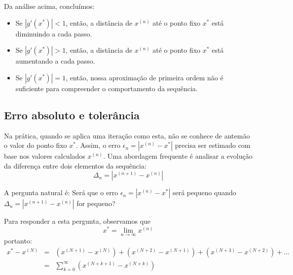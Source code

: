\begin{ex}
\begin{obs} Da análise acima, concluímos:
\begin{itemize}
\item Se $|g'(x^*)|<1$, então, a distância de $x^{(n)}$ até o ponto fixo $x^*$ está diminuindo a cada passo.
\item Se $|g'(x^*)|>1$, então, a distância de $x^{(n)}$ até o ponto fixo $x^*$ está aumentando a cada passo.
\item Se $|g'(x^*)|=1$, então, nossa aproximação de primeira ordem não é suficiente para compreender o comportamento da sequência.
\end{itemize}
\end{obs}

\subsection{Erro absoluto e tolerância}

Na prática, quando se aplica uma iteração como esta, não se conhece de antemão o valor do ponto fixo $x^*$. Assim, o erro $\epsilon_n=\left|x^{(n)}-x^*\right|$ precisa ser estimado com base nos valores calculados $x^{(n)}$. Uma abordagem frequente é analisar a evolução da diferença entre dois elementos da sequência:
\begin{equation} \Delta_n=\left|x^{(n+1)}-x^{(n)}\right| \end{equation}

A pergunta natural é: Será que o erro $\epsilon_n=\left|x^{(n)}-x^*\right|$ será pequeno quando  $\Delta_n=\left|x^{(n+1)}-x^{(n)}\right|$ for pequeno?

Para responder a esta pergunta, observamos que
\begin{equation} x^*=\lim_{n\to \infty }x^{(n)} \end{equation}
portanto:
\begin{eqnarray}
x^*-x^{(N)}&=&  \left(x^{(N+1)}-x^{(N)}\right)+\left(x^{(N+2)}-x^{(N+1)}\right)+\left(x^{(N+3)}-x^{(N+2)}\right)+\ldots\\
&=&\sum_{k=0}^\infty \left(x^{(N+k+1)}-x^{(N+k)}\right)
\end{eqnarray}


\end{ex}
